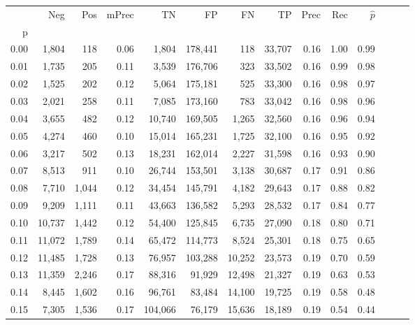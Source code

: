 \begin{tabular}{rrrrrrrrrrrrrr}
\toprule
{} &     Neg &    Pos & mPrec &       TN &       FP &      FN &      TP &  Prec &   Rec & $\hat{p}$ \\
p    &         &        &       &          &          &         &         &       &       &           \\
\midrule
0.00 &   1,804 &    118 &  0.06 &    1,804 &  178,441 &     118 &  33,707 &  0.16 &  1.00 &      0.99 \\
0.01 &   1,735 &    205 &  0.11 &    3,539 &  176,706 &     323 &  33,502 &  0.16 &  0.99 &      0.98 \\
0.02 &   1,525 &    202 &  0.12 &    5,064 &  175,181 &     525 &  33,300 &  0.16 &  0.98 &      0.97 \\
0.03 &   2,021 &    258 &  0.11 &    7,085 &  173,160 &     783 &  33,042 &  0.16 &  0.98 &      0.96 \\
0.04 &   3,655 &    482 &  0.12 &   10,740 &  169,505 &   1,265 &  32,560 &  0.16 &  0.96 &      0.94 \\
0.05 &   4,274 &    460 &  0.10 &   15,014 &  165,231 &   1,725 &  32,100 &  0.16 &  0.95 &      0.92 \\
0.06 &   3,217 &    502 &  0.13 &   18,231 &  162,014 &   2,227 &  31,598 &  0.16 &  0.93 &      0.90 \\
0.07 &   8,513 &    911 &  0.10 &   26,744 &  153,501 &   3,138 &  30,687 &  0.17 &  0.91 &      0.86 \\
0.08 &   7,710 &  1,044 &  0.12 &   34,454 &  145,791 &   4,182 &  29,643 &  0.17 &  0.88 &      0.82 \\
0.09 &   9,209 &  1,111 &  0.11 &   43,663 &  136,582 &   5,293 &  28,532 &  0.17 &  0.84 &      0.77 \\
0.10 &  10,737 &  1,442 &  0.12 &   54,400 &  125,845 &   6,735 &  27,090 &  0.18 &  0.80 &      0.71 \\
0.11 &  11,072 &  1,789 &  0.14 &   65,472 &  114,773 &   8,524 &  25,301 &  0.18 &  0.75 &      0.65 \\
0.12 &  11,485 &  1,728 &  0.13 &   76,957 &  103,288 &  10,252 &  23,573 &  0.19 &  0.70 &      0.59 \\
0.13 &  11,359 &  2,246 &  0.17 &   88,316 &   91,929 &  12,498 &  21,327 &  0.19 &  0.63 &      0.53 \\
0.14 &   8,445 &  1,602 &  0.16 &   96,761 &   83,484 &  14,100 &  19,725 &  0.19 &  0.58 &      0.48 \\
0.15 &   7,305 &  1,536 &  0.17 &  104,066 &   76,179 &  15,636 &  18,189 &  0.19 &  0.54 &      0.44 \\

\end{tabular}
